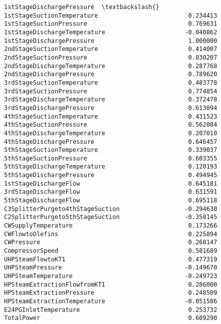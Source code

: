 \documentclass[11pt]{article}
\begin{document}
\begin{tcolorbox}[breakable, size=fbox, boxrule=.5pt, pad at break*=1mm, opacityfill=0]
\begin{Verbatim}[commandchars=\\\{\}]
                                  1stStageDischargePressure  \textbackslash{}
1stStageSuctionTemperature                         0.234413
1stStageSuctionPressure                            0.769631
1stStageDischargeTemperature                      -0.040862
1stStageDischargePressure                          1.000000
2ndStageSuctionTemperature                         0.414007
2ndStageSuctionPressure                            0.830207
2ndStageDischargeTemperature                       0.287768
2ndStageDischargePressure                          0.789620
3rdStageSuctionTemperature                         0.483778
3rdStageSuctionPressure                            0.774854
3rdStageDischargeTemperature                       0.372478
3rdStageDischargePressure                          0.613094
4thStageSuctionTemperature                         0.431523
4thStageSuctionPressure                            0.562084
4thStageDischargeTemperature                       0.207010
4thStageDischargePressure                          0.646457
5thStageSuctionTemperature                         0.339037
5thStageSuctionPressure                            0.603355
5thStageDischargeTemperature                       0.120193
5thStageDischargePressure                          0.494945
1stStageDischargeFlow                              0.645181
3rdStageDischargeFlow                              0.631591
5thStageDischargeFlow                              0.695118
C3SplitterPurgeto4thStageSuction                  -0.294630
C2SplitterPurgeto5thStageSuction                  -0.358145
CWSupplyTemperature                                0.173266
CWFlowtoOlefins                                    0.225894
CWPressure                                         0.268147
CompressorSpeed                                    0.581689
UHPSteamFlowtoKT1                                  0.477319
UHPSteamPressure                                  -0.149670
UHPSteamTemperature                               -0.249723
HPSteamExtractionFlowfromKT1                       0.286000
HPSteamExtractionPressure                          0.248509
HPSteamExtractionTemperature                      -0.051586
E24PGInletTemperature                              0.253732
TotalPower                                         0.609290


\end{Verbatim}
\end{tcolorbox}
\end{document}
